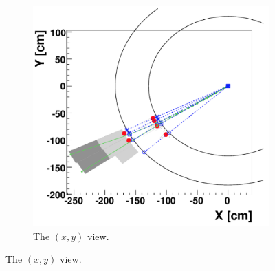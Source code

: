 \begin{figure}
	\centering
	\begin{subfigure}{1\textwidth}
		\includegraphics[width=.8\linewidth]{analysis/pics/PF_a.png}
		\caption{The $(x, y)$ view.}
		\label{fig:PF_a}
	\end{subfigure}
	

\end{figure}
